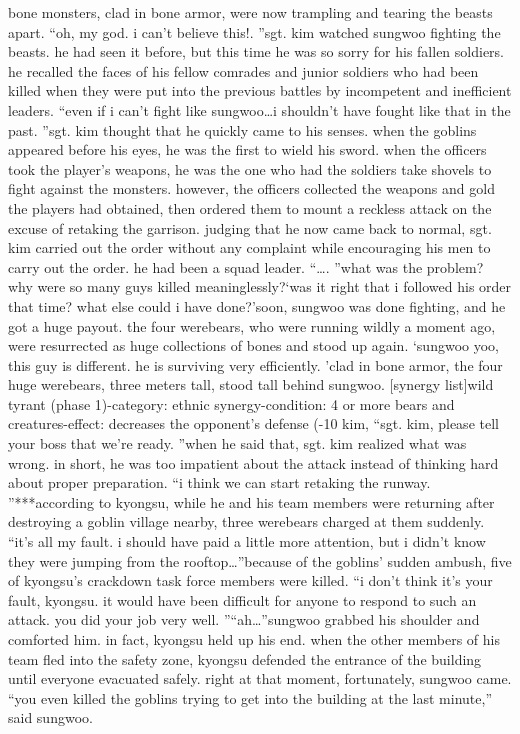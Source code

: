 bone monsters, clad in bone armor, were now trampling and tearing the beasts apart.
“oh, my god.
 i can’t believe this!.
”sgt.
 kim watched sungwoo fighting the beasts.
 he had seen it before, but this time he was so sorry for his fallen soldiers.
he recalled the faces of his fellow comrades and junior soldiers who had been killed when they were put into the previous battles by incompetent and inefficient leaders.
“even if i can’t fight like sungwoo…i shouldn’t have fought like that in the past.
”sgt.
 kim thought that he quickly came to his senses.
 when the goblins appeared before his eyes, he was the first to wield his sword.
 when the officers took the player’s weapons, he was the one who had the soldiers take shovels to fight against the monsters.
however, the officers collected the weapons and gold the players had obtained, then ordered them to mount a reckless attack on the excuse of retaking the garrison.
 judging that he now came back to normal, sgt.
 kim carried out the order without any complaint while encouraging his men to carry out the order.
 he had been a squad leader.
“….
”what was the problem? why were so many guys killed meaninglessly?‘was it right that i followed his order that time? what else could i have done?’soon, sungwoo was done fighting, and he got a huge payout.
 the four werebears, who were running wildly a moment ago, were resurrected as huge collections of bones and stood up again.
‘sungwoo yoo, this guy is different.
 he is surviving very efficiently.
’clad in bone armor, the four huge werebears, three meters tall, stood tall behind sungwoo.
[synergy list]wild tyrant (phase 1)-category: ethnic synergy-condition: 4 or more bears and creatures-effect: decreases the opponent’s defense (-10%
 kim, “sgt.
 kim, please tell your boss that we’re ready.
”when he said that, sgt.
 kim realized what was wrong.
 in short, he was too impatient about the attack instead of thinking hard about proper preparation.
“i think we can start retaking the runway.
”***according to kyongsu, while he and his team members were returning after destroying a goblin village nearby, three werebears charged at them suddenly.
“it’s all my fault.
 i should have paid a little more attention, but i didn’t know they were jumping from the rooftop…”because of the goblins’ sudden ambush, five of kyongsu’s crackdown task force members were killed.
“i don’t think it’s your fault, kyongsu.
 it would have been difficult for anyone to respond to such an attack.
 you did your job very well.
”“ah…”sungwoo grabbed his shoulder and comforted him.
 in fact, kyongsu held up his end.
when the other members of his team fled into the safety zone, kyongsu defended the entrance of the building until everyone evacuated safely.
right at that moment, fortunately, sungwoo came.
“you even killed the goblins trying to get into the building at the last minute,” said sungwoo.


